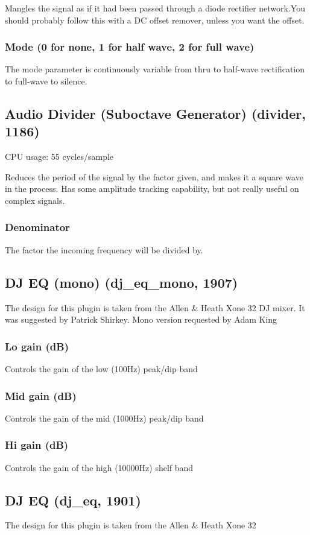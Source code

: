 \documentclass[11pt]{article}
\begin{document}
Mangles the signal as if it had been passed through a diode rectifier network.You should probably follow this with a DC offset remover, unless you want the offset.\subsubsection*{Mode (0 for none, 1 for half wave, 2 for full wave)}
The mode parameter is continuously variable from thru to half-wave rectification to full-wave to silence.\subsection{Audio Divider (Suboctave Generator) (divider, 1186)\label{divider}\label{id1186}}
CPU usage: 55 cycles/sample

Reduces the period of the signal by the factor given, and makes it a square wave in the process. Has some amplitude tracking capability, but not really useful on complex signals.\subsubsection*{Denominator}
The factor the incoming frequency will be divided by.\subsection{DJ EQ (mono) (dj\_eq\_mono, 1907)\label{dj_eq_mono}\label{id1907}}
The design for this plugin is taken from the Allen \& Heath Xone 32
DJ mixer. It was suggested by Patrick Shirkey. Mono version requested by Adam King\subsubsection*{Lo gain (dB)}
Controls the gain of the low (100Hz) peak/dip band\subsubsection*{Mid gain (dB)}
Controls the gain of the mid (1000Hz) peak/dip band\subsubsection*{Hi gain (dB)}
Controls the gain of the high (10000Hz) shelf band\subsection{DJ EQ (dj\_eq, 1901)\label{dj_eq}\label{id1901}}
The design for this plugin is taken from the Allen \& Heath Xone 32
\end{document}
